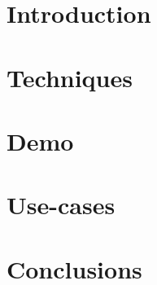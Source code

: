 \section[Intro]{Introduction}




\section[Techniques]{Techniques}



\section[Demo]{Demo}


\section[Use]{Use-cases}




\section[Concl]{Conclusions}
